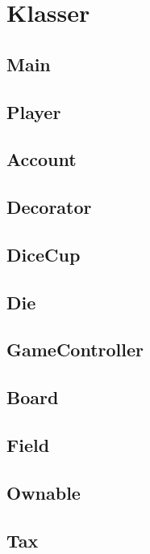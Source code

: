 \section{Klasser}
\subsection{Main}
\subsection{Player}
\subsection{Account}
\subsection{Decorator}
\subsection{DiceCup}
\subsection{Die}
\subsection{GameController}
\subsection{Board}
\subsection{Field}
\subsection{Ownable}
\subsection{Tax}